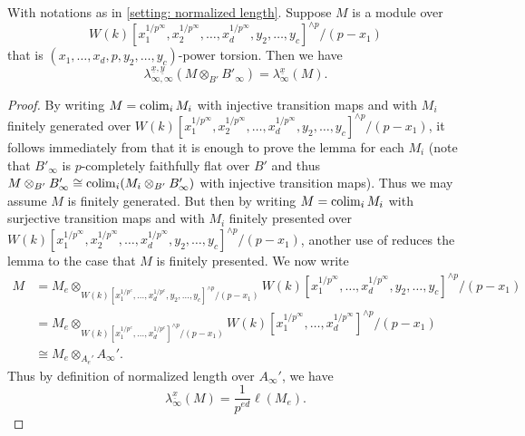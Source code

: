 \documentclass[12pt]{amsart}
\numberwithin{equation}{theorem}
\numberwithin{equation}{theorem}
\begin{document}
\begin{lemma}
\label{lem: chi_inftyinfty = chi_infty trivial extension}
With notations as in \autoref{setting: normalized length}. Suppose $M$ is a module over $$W(k)[x_1^{1/p^\infty},x_2^{1/p^\infty}, \dots,x_d^{1/p^\infty},y_2,\dots,y_c]^{\wedge p}/(p-x_1)$$ that is $(x_1,\dots,x_d, p, y_2,\dots,y_c)$-power torsion. Then we have 
$$\lambda_{\infty,\infty}^{\underline{x},\underline{y}}(M\otimes_{B'}B'_\infty)=\lambda_\infty^{\underline{x}}(M).$$
\end{lemma}
\begin{proof}
By writing $M=\operatorname{{colim}}_i M_i$ with injective transition maps and with $M_i$ finitely generated over $W(k)[x_1^{1/p^\infty},x_2^{1/p^\infty}, \dots,x_d^{1/p^\infty},y_2,\dots,y_c]^{\wedge p}/(p-x_1)$, it follows immediately from \cite[Proposition 2.2.6 (b)]{CaiLeeMaSchwedeTuckerPerfdSignature2026} that it is enough to prove the lemma for each $M_i$ (note that $B'_\infty$ is $p$-completely faithfully flat over $B'$ and thus $M\otimes_{B'}B'_\infty \cong \operatorname{{colim}}_i (M_i\otimes_{B'}B'_\infty)$ with injective transition maps). Thus we may assume $M$ is finitely generated. But then by writing $M=\operatorname{{colim}}_i M_i$ with surjective transition maps and with $M_i$ finitely presented over $W(k)[x_1^{1/p^\infty},x_2^{1/p^\infty}, \dots,x_d^{1/p^\infty},y_2,\dots,y_c]^{\wedge p}/(p-x_1)$, another use of \cite[Proposition 2.2.6 (b)]{CaiLeeMaSchwedeTuckerPerfdSignature2026}  reduces the lemma to the case that $M$ is finitely presented. We now write 
\begin{align*}
 M & = M_e \otimes_{W(k)[x_1^{1/p^e}, \dots,x_d^{1/p^e},y_2,\dots,y_c]^{\wedge p}/(p-x_1)}W(k)[x_1^{1/p^\infty}, \dots,x_d^{1/p^\infty},y_2,\dots,y_c]^{\wedge p}/(p-x_1) \\   
 & = M_e \otimes_{W(k)[x_1^{1/p^e}, \dots,x_d^{1/p^e}]^{\wedge p}/(p-x_1)}W(k)[x_1^{1/p^\infty},\dots,x_d^{1/p^\infty}]^{\wedge p}/(p-x_1) \\
 & \cong  M_e \otimes_{A_e'} A_\infty'.
\end{align*}
Thus by definition of normalized length over $A_\infty'$, we have 
$$\lambda_\infty^{\underline{x}}(M) = \frac{1}{p^{ed}}\ell(M_e).$$


\end{proof}
\end{document}
